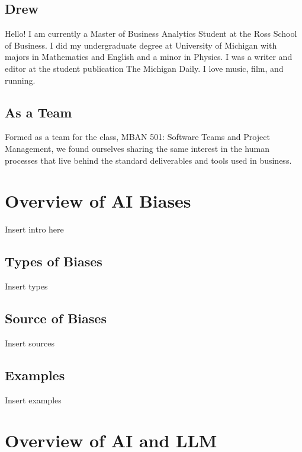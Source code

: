 \documentclass[
]{book}
\begin{document}
\hypertarget{drew}{%
\section*{Drew}\label{drew}}

Hello! I am currently a Master of Business Analytics Student at the Ross School of Business. I did my undergraduate degree at University of Michigan with majors in Mathematics and English and a minor in Physics. I was a writer and editor at the student publication The Michigan Daily. I love music, film, and running.

\hypertarget{as-a-team}{%
\section*{As a Team}\label{as-a-team}}

Formed as a team for the class, MBAN 501: Software Teams and Project Management, we found ourselves sharing the same interest in the human processes that live behind the standard deliverables and tools used in business.

\hypertarget{overview-of-ai-biases}{%
\chapter{Overview of AI Biases}\label{overview-of-ai-biases}}

Insert intro here

\hypertarget{types-of-biases}{%
\section{Types of Biases}\label{types-of-biases}}

Insert types

\hypertarget{source-of-biases}{%
\section{Source of Biases}\label{source-of-biases}}

Insert sources

\hypertarget{examples}{%
\section{Examples}\label{examples}}

Insert examples

\hypertarget{overview-of-ai-and-llm}{%
\chapter{Overview of AI and LLM}\label{overview-of-ai-and-llm}}
\end{document}
